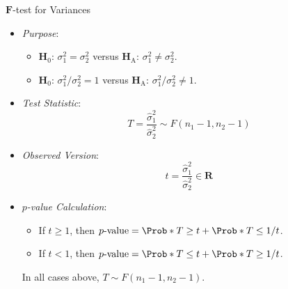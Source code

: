 \begin{Statistical_Test}{$ \symbf{F} $-test for Variances}{}
      \begin{itemize}
            \item \emph{Purpose}:
                  \begin{itemize}
                        \item $ \mathbf{H}_0 $: $ \sigma_1^2=\sigma_2^2 $ versus $ \mathbf{H}_\text{A} $: $ \sigma_1^2\ne \sigma_2^2 $.
                        \item $ \mathbf{H}_0 $: $ \sigma_1^2/\sigma_2^2=1 $ versus $ \mathbf{H}_\text{A} $: $ \sigma_1^2/\sigma_2^2\ne 1 $.
                  \end{itemize}
            \item \emph{Test Statistic}:
                  \[ T=\frac{\hat{\sigma}_1^2}{\hat{\sigma}_2^2}\sim F(n_1-1,n_2-1)  \]
            \item \emph{Observed Version}:
                  \[ t=\frac{\hat{\sigma}_1^2}{\hat{\sigma}_2^2}\in\mathbf{R}   \]
            \item \emph{$ p $-value Calculation}:
                  \begin{itemize}
                        \item If $ t\ge 1 $, then $ p\text{-value}=\Prob*{T\ge t}+\Prob*{T\le 1/t} $.
                        \item If $ t<1 $, then $ p\text{-value}=\Prob*{T\le t}+\Prob*{T\ge 1/t} $.
                  \end{itemize}
                  \begin{Remark}{}{}
                        In all cases above, $ T \sim F(n_1-1,n_2-1) $.
                  \end{Remark}
      \end{itemize}
\end{Statistical_Test}
